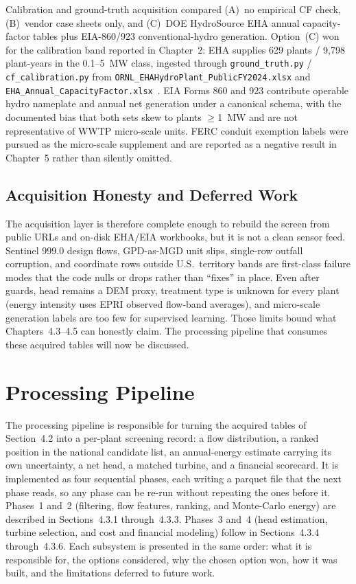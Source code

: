 \documentclass[12pt,letterpaper]{report}
\begin{document}
Calibration and ground-truth acquisition compared (A)~no empirical CF check,
(B)~vendor case sheets only, and (C)~DOE HydroSource EHA annual capacity-factor
tables plus EIA-860/923 conventional-hydro generation. Option~(C) won for the
calibration band reported in Chapter~2: EHA supplies 629 plants /
9{,}798 plant-years in the 0.1--5~MW class, ingested through
\texttt{ground\_truth.py} / \texttt{cf\_calibration.py} from
\texttt{ORNL\_EHAHydroPlant\_PublicFY2024.xlsx} and
\texttt{EHA\_Annual\_CapacityFactor.xlsx}~\cite{hydrosource_eha}. EIA Forms 860
and 923 contribute operable hydro nameplate and annual net generation under a
canonical schema, with the documented bias that both sets skew to plants
$\geq$1~MW and are not representative of WWTP micro-scale units. FERC conduit
exemption labels were pursued as the micro-scale supplement and are reported as a
negative result in Chapter~5 rather than silently omitted.

\subsection{Acquisition Honesty and Deferred Work}

The acquisition layer is therefore complete enough to rebuild the screen from
public URLs and on-disk EHA/EIA workbooks, but it is not a clean sensor feed.
Sentinel 999.0 design flows, GPD-as-MGD unit slips, single-row outfall corruption,
and coordinate rows outside U.S.\ territory bands are first-class failure modes
that the code nulls or drops rather than ``fixes'' in place. Even after guards,
head remains a DEM proxy, treatment type is unknown for every plant (energy
intensity uses EPRI observed flow-band averages), and micro-scale generation labels
are too few for supervised learning. Those limits bound what Chapters~4.3--4.5 can
honestly claim. The processing pipeline that consumes these acquired tables will
now be discussed.

\section{Processing Pipeline}                            %

The processing pipeline is responsible for turning the acquired tables of
Section~4.2 into a per-plant screening record: a flow distribution, a ranked
position in the national candidate list, an annual-energy estimate carrying its
own uncertainty, a net head, a matched turbine, and a financial scorecard. It is
implemented as four sequential phases, each writing a parquet file that the next
phase reads, so any phase can be re-run without repeating the ones before it.
Phases~1 and~2 (filtering, flow features, ranking, and Monte-Carlo energy)
are described in Sections~4.3.1 through~4.3.3. Phases~3 and~4 (head
estimation, turbine selection, and cost and financial modeling) follow in
Sections~4.3.4 through~4.3.6. Each subsystem is presented in the same order:
what it is responsible for, the options considered, why the chosen option won,
how it was built, and the limitations deferred to future work.
\end{document}
